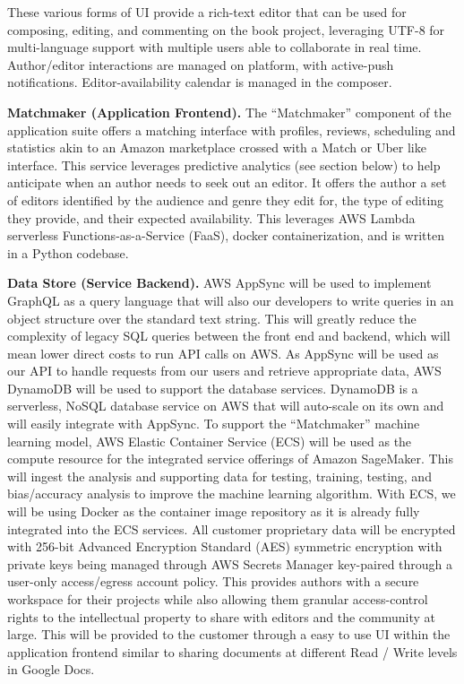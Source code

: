 \documentclass[10pt,openany]{book}
\begin{document}
These various forms of UI provide a rich-text editor that can be used
for composing, editing, and commenting on the book project, leveraging
UTF-8 for multi-language support with multiple users able to collaborate
in real time. Author/editor interactions are managed on platform, with
active-push notifications. Editor-availability calendar is managed in
the composer.

\textbf{Matchmaker (Application Frontend).} The ``Matchmaker'' component
of the application suite offers a matching interface with profiles,
reviews, scheduling and statistics akin to an Amazon marketplace crossed
with a Match or Uber like interface. This service leverages predictive
analytics (see section below) to help anticipate when an author needs to
seek out an editor. It offers the author a set of editors identified by
the audience and genre they edit for, the type of editing they provide,
and their expected availability. This leverages AWS Lambda serverless
Functions-as-a-Service (FaaS), docker containerization, and is written
in a Python codebase.

\textbf{Data Store (Service Backend).} AWS AppSync will be used to
implement GraphQL as a query language that will also our developers to
write queries in an object structure over the standard text string. This
will greatly reduce the complexity of legacy SQL queries between the
front end and backend, which will mean lower direct costs to run API
calls on AWS. As AppSync will be used as our API to handle requests from
our users and retrieve appropriate data, AWS DynamoDB will be used to
support the database services. DynamoDB is a serverless, NoSQL database
service on AWS that will auto-scale on its own and will easily integrate
with AppSync. To support the ``Matchmaker'' machine learning model, AWS
Elastic Container Service (ECS) will be used as the compute resource for
the integrated service offerings of Amazon SageMaker. This will ingest
the analysis and supporting data for testing, training, testing, and
bias/accuracy analysis to improve the machine learning algorithm. With
ECS, we will be using Docker as the container image repository as it is
already fully integrated into the ECS services. All customer proprietary
data will be encrypted with 256-bit Advanced Encryption Standard (AES)
symmetric encryption with private keys being managed through AWS Secrets
Manager key-paired through a user-only access/egress account policy.
This provides authors with a secure workspace for their projects while
also allowing them granular access-control rights to the intellectual
property to share with editors and the community at large. This will be
provided to the customer through a easy to use UI within the application
frontend similar to sharing documents at different Read / Write levels
in Google Docs.
\end{document}
